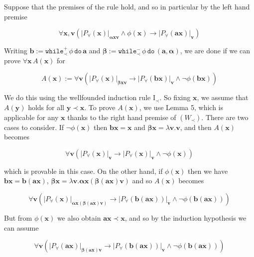 Suppose that the premises of the rule hold, and so in particular by the left hand premise\par
  
\par  \quad  \[\forall\bm{x},\bm{v}\left(|{P_{\forall}(\bm{x})}|_{\bm{\alpha}\bm{x}\bm{v}}\wedge\phi(\bm{x})\to|{P_{\forall}(\bm{a}\bm{x})}|_{\bm{v}}\right)\]\quad  \quad  
  
Writing $\bm{b}:=\mathtt{while}^{+}_{\prec}\,{\phi}\,\mathtt{do}\,{\bm{a}}$ and $\bm{\beta}:=\mathtt{while}^{-}_{\prec}\,{\phi}\,\mathtt{do}\,{(\bm{a},\bm{\alpha})}$, we are done if we can prove $\forall\bm{x}\,A(\bm{x})$ for\par
  
\par  \quad  \[A(\bm{x}):=\forall\bm{v}\left(|{P_{\forall}(\bm{x})}|_{\bm{\beta}\bm{x}\bm{v}}\to|{P_{\forall}(\bm{b}\bm{x})}|_{\bm{v}}\wedge\neg\phi(\bm{b}\bm{x})\right)\]\quad  \quad  
  
We do this using the wellfounded induction rule $\mathrm{I}_{\prec}$. So fixing $\bm{x}$, we assume that $A(\bm{y})$ holds for all $\bm{y}\prec\bm{x}$. To prove $A(\bm{x})$, we use Lemma 5, which is applicable for any $\bm{x}$ thanks to the right hand premise of $(W_{\prec})$. There are two cases to consider. If $\neg\phi(\bm{x})$ then $\bm{b}\bm{x}=\bm{x}$ and $\bm{\beta}\bm{x}=\lambda\bm{v}.\bm{v}$, and then $A(\bm{x})$ becomes\par
  
\par  \quad  \[\forall\bm{v}\left(|{P_{\forall}(\bm{x})}|_{\bm{v}}\to|{P_{\forall}(\bm{x})}|_{\bm{v}}\wedge\neg\phi(\bm{x})\right)\]\quad  \quad  
  
which is provable in this case. On the other hand, if $\phi(\bm{x})$ then we have $\bm{b}\bm{x}=\bm{b}(\bm{a}\bm{x})$, $\bm{\beta}\bm{x}=\lambda\bm{v}.\bm{\alpha}\bm{x}(\bm{\beta}(\bm{a}\bm{x})\bm{v})$ and so $A(\bm{x})$ becomes\par
  
\par  \quad  \[\forall\bm{v}\left(|{P_{\forall}(\bm{x})}|_{\bm{\alpha}\bm{x}(\bm{\beta}(\bm{a}\bm{x})\bm{v})}\to|{P_{\forall}(\bm{b}(\bm{a}\bm{x}))}|_{\bm{v}}\wedge\neg\phi(\bm{b}(\bm{a}\bm{x}))\right)\]\quad  \quad  
  
But from $\phi(\bm{x})$ we also obtain $\bm{a}\bm{x}\prec\bm{x}$, and so by the induction hypothesis we can assume\par
  
\par  \quad  \[\forall\bm{v}\left(|{P_{\forall}(\bm{a}\bm{x})}|_{\bm{\beta}(\bm{a}\bm{x})\bm{v}}\to|{P_{\forall}(\bm{b}(\bm{a}\bm{x}))}|_{\bm{v}}\wedge\neg\phi(\bm{b}(\bm{a}\bm{x}))\right)\]\quad  \quad  
  
